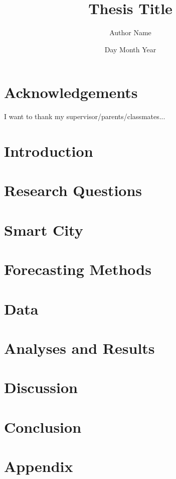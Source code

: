 \documentclass[12pt]{report}
\title{Thesis Title}
\author{Author Name}
\date{Day Month Year}
\begin{document}




\doublespacing
\tableofcontents
\singlespacing


\listoffigures

\listoftables



\chapter*{Acknowledgements}
I want to thank my supervisor/parents/classmates...

\chapter{Introduction}


\chapter{Research Questions}

 
\chapter{Smart City}

 
\chapter{Forecasting Methods}


\chapter{Data}


\chapter{Analyses and Results}


\chapter{Discussion}


\chapter{Conclusion}


\appendix
\chapter{Appendix}


\printbibliography[title = References]
\end{document}
